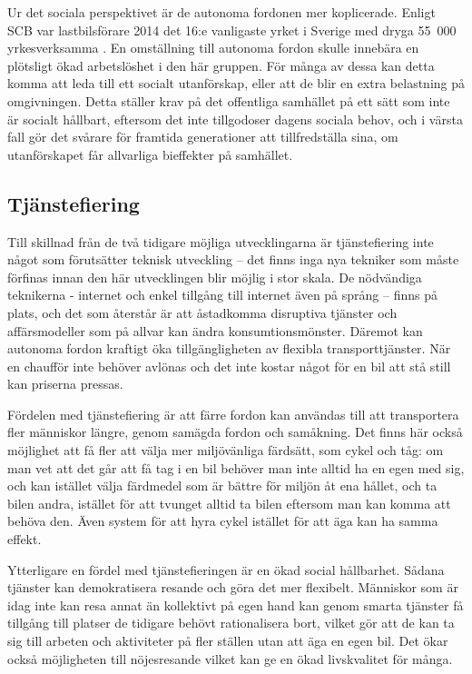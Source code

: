 \documentclass{article}
\begin{document}
Ur det sociala perspektivet är de autonoma fordonen mer koplicerade. Enligt SCB var lastbilsförare 2014 det 16:e vanligaste yrket i Sverige med dryga 55\ 000 yrkesverksamma . En omställning till autonoma fordon skulle innebära en plötsligt ökad arbetslöshet i den här gruppen. För många av dessa kan detta komma att leda till ett socialt utanförskap, eller att de blir en extra belastning på omgivningen. Detta ställer krav på det offentliga samhället på ett sätt som inte är socialt hållbart, eftersom det inte tillgodoser dagens sociala behov, och i värsta fall gör det svårare för framtida generationer att tillfredställa sina, om utanförskapet får allvarliga bieffekter på samhället.

\subsection{Tjänstefiering}

Till skillnad från de två tidigare möjliga utvecklingarna är tjänstefiering inte något som förutsätter teknisk utveckling – det finns inga nya tekniker som måste förfinas innan den här utvecklingen blir möjlig i stor skala. De nödvändiga teknikerna - internet och enkel tillgång till internet även på språng – finns på plats, och det som återstår är att åstadkomma disruptiva tjänster och affärsmodeller som på allvar kan ändra konsumtionsmönster. Däremot kan autonoma fordon kraftigt öka tillgängligheten av flexibla transporttjänster. När en chaufför inte behöver avlönas och det inte kostar något för en bil att stå still kan priserna pressas.

Fördelen med tjänstefiering är att färre fordon kan användas till att transportera fler människor längre, genom samägda fordon och samåkning. Det finns här också möjlighet att få fler att välja mer miljövänliga färdsätt, som cykel och tåg: om man vet att det går att få tag i en bil behöver man inte alltid ha en egen med sig, och kan istället välja färdmedel som är bättre för miljön åt ena hållet, och ta bilen andra, istället för att tvunget alltid ta bilen eftersom man kan komma att behöva den. Även system för att hyra cykel istället för att äga kan ha samma effekt.

Ytterligare en fördel med tjänstefieringen är en ökad social hållbarhet. Sådana tjänster kan demokratisera resande och göra det mer flexibelt. Människor som är idag inte kan resa annat än kollektivt på egen hand kan genom smarta tjänster få tillgång till platser de tidigare behövt rationalisera bort, vilket gör att de kan ta sig till arbeten och aktiviteter på fler ställen utan att äga en egen bil. Det ökar också möjligheten till nöjesresande vilket kan ge en ökad livskvalitet för många.
\end{document}
